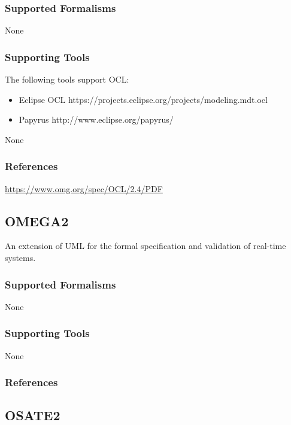 \subsubsection{Supported Formalisms}

None


\subsubsection{Supporting Tools}

The following tools support OCL:
\begin{itemize}
    \item Eclipse OCL https://projects.eclipse.org/projects/modeling.mdt.ocl
    \item Papyrus http://www.eclipse.org/papyrus/
\end{itemize}
None


\subsubsection{References}
\url{https://www.omg.org/spec/OCL/2.4/PDF}




\subsection{OMEGA2}
\label{subsecL:OMEGA2}


An extension of UML for the formal specification and validation of real-time systems.

\subsubsection{Supported Formalisms}

None


\subsubsection{Supporting Tools}

None


\subsubsection{References}





\subsection{OSATE2}
\label{subsecL:OSATE2}

